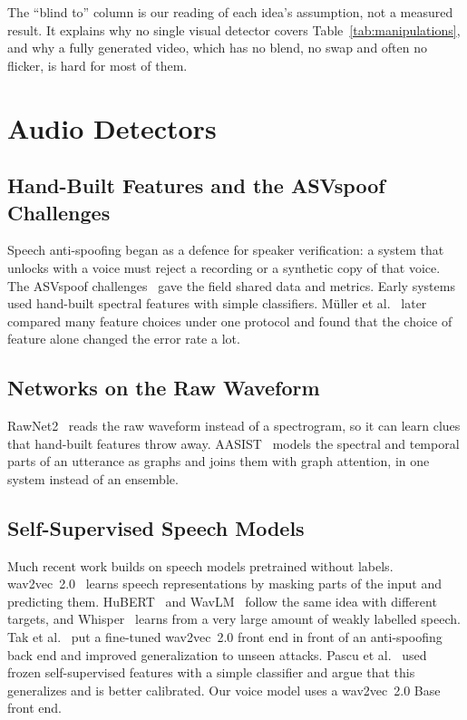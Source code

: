 The ``blind to'' column is our reading of each idea's assumption, not a
measured result. It explains why no single visual detector covers
Table~\ref{tab:manipulations}, and why a fully generated video, which has no
blend, no swap and often no flicker, is hard for most of them.

\section{Audio Detectors}
\label{sec:l-audio}

\subsection{Hand-Built Features and the ASVspoof Challenges}

Speech anti-spoofing began as a defence for speaker verification: a system
that unlocks with a voice must reject a recording or a synthetic copy of that
voice. The ASVspoof challenges~\cite{asvspoof2019,asvspoof2021} gave the field
shared data and metrics. Early systems used hand-built spectral features with
simple classifiers. M\"uller et al.~\cite{mueller2022} later compared many
feature choices under one protocol and found that the choice of feature alone
changed the error rate a lot.

\subsection{Networks on the Raw Waveform}

RawNet2~\cite{rawnet2} reads the raw waveform instead of a spectrogram, so it
can learn clues that hand-built features throw away. AASIST~\cite{aasist}
models the spectral and temporal parts of an utterance as graphs and joins
them with graph attention, in one system instead of an ensemble.

\subsection{Self-Supervised Speech Models}

Much recent work builds on speech models pretrained without labels.
wav2vec~2.0~\cite{wav2vec2} learns speech representations by masking parts of
the input and predicting them. HuBERT~\cite{hubert} and WavLM~\cite{wavlm}
follow the same idea with different targets, and Whisper~\cite{whisper}
learns from a very large amount of weakly labelled speech. Tak et
al.~\cite{tak2022} put a fine-tuned wav2vec~2.0 front end in front of an
anti-spoofing back end and improved generalization to unseen attacks. Pascu et
al.~\cite{pascu2024} used frozen self-supervised features with a simple
classifier and argue that this generalizes and is better calibrated. Our
voice model uses a wav2vec~2.0 Base front end.

